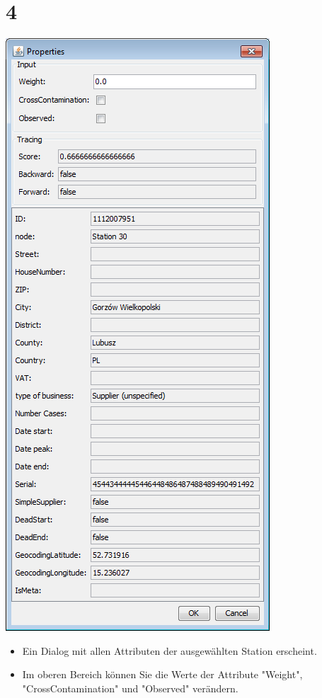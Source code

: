 \documentclass{beamer}
\begin{document}
\section{4}
\begin{frame}
	\begin{center}
  		\includegraphics[height=0.6\textheight]{4.png}
	\end{center}
	\begin{itemize}
		\item Ein Dialog mit allen Attributen der ausgewählten Station erscheint.
		\item Im oberen Bereich können Sie die Werte der Attribute "Weight", "CrossContamination" und "Observed" verändern.		
	\end{itemize}
\end{frame}
\end{document}

